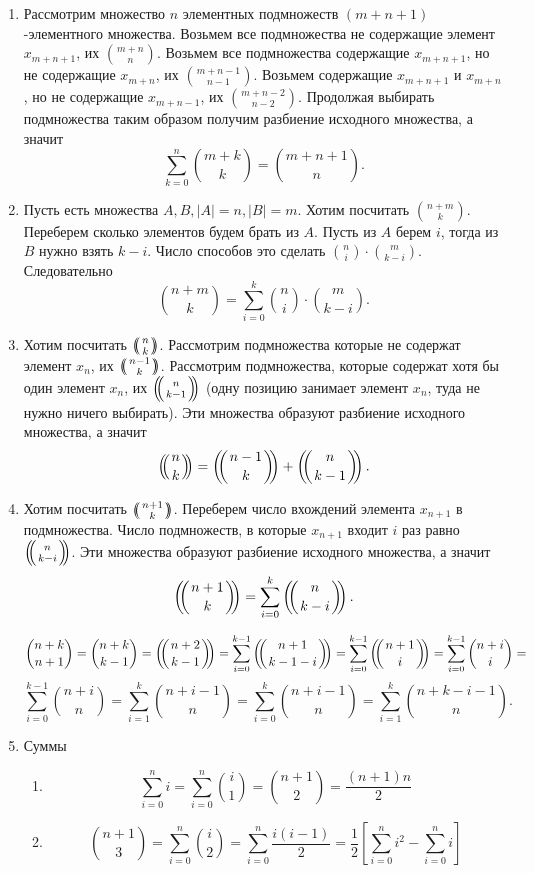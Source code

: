 \documentclass[10pt]{article}
\newcommand{\rchoose}[2]{\left(\mkern-6mu \left({#1 \atop #2}\right) \mkern-6mu \right)}
\begin{document}
\begin{enumerate}[label*=2.\arabic*]
	\item Рассмотрим множество $n$ элементных подмножеств $(m+n+1)$-элементного множества. Возьмем все подмножества не содержащие элемент $x_{m+n+1}$, их ${m+n \choose n}$. Возьмем все подмножества содержащие $x_{m+n+1}$, но не содержащие $x_{m+n}$, их ${m+n-1 \choose n-1}$. Возьмем содержащие $x_{m+n+1}$ и $x_{m+n}$, но не содержащие $x_{m+n-1}$, их ${m+n-2 \choose n-2}$. Продолжая выбирать подмножества таким образом получим разбиение исходного множества, а значит $$\sum_{k=0}^n {m+k \choose k} = {m+n+1 \choose n}.$$
	
	\item Пусть есть множества $A, B, |A|=n, |B|=m$. Хотим посчитать ${n+m \choose k}$. Переберем сколько элементов будем брать из $A$. Пусть из $A$ берем $i$, тогда из $B$ нужно взять $k-i$. Число способов это сделать ${n \choose i} \cdot {m \choose k-i}$. Следовательно $${n+m \choose k} = \sum_{i=0}^k {n \choose i} \cdot {m \choose k-i}.$$
	
	\item Хотим посчитать $\rchoose{n}{k}$. Рассмотрим подмножества которые не содержат элемент $x_n$, их $\rchoose{n-1}{k}$. Рассмотрим подмножества, которые содержат хотя бы один элемент $x_n$, их $\rchoose{n}{k-1}$ (одну позицию занимает элемент $x_n$, туда не нужно ничего выбирать). Эти множества образуют разбиение исходного множества, а значит $$\rchoose{n}{k} = \rchoose{n-1}{k} + \rchoose{n}{k-1}.$$
	
	\item Хотим посчитать $\rchoose{n+1}{k}$. Переберем число вхождений элемента $x_{n+1}$ в подмножества. Число подмножеств, в которые $x_{n+1}$ входит $i$ раз равно $\rchoose{n}{k-i}$. Эти множества образуют разбиение исходного множества, а значит $$\rchoose{n+1}{k} = \sum_{i=0}^k \rchoose{n}{k-i}.$$
	
	$${n+k \choose n+1} = {n+k \choose k-1} = \rchoose{n+2}{k-1} = \sum_{i=0}^{k-1} \rchoose{n+1}{k-1-i} = \sum_{i=0}^{k-1} \rchoose{n+1}{i} = \sum_{i=0}^{k-1} \binom{n+i}{i} =$$  $$\sum_{i=0}^{k-1} \binom{n+i}{n} = \sum_{i=1}^{k} \binom{n+i-1}{n} = \sum_{i=0}^{k} \binom{n+i-1}{n} = \sum_{i=1}^{k} \binom{n+k - i-1}{n}.$$
	
	\item Суммы
	\begin{enumerate}
	\item $$ \sum_{i=0}^n i = \sum_{i=0}^n \binom{i}{1} = \binom{n+1}{2} = \frac{(n+1)n}{2}$$
	\item $$\binom{n+1}{3} = \sum_{i=0}^n \binom{i}{2} = \sum_{i=0}^n \frac{i(i-1)}{2} = \frac{1}{2} \left[ \sum_{i=0}^n {i^2} - \sum_{i=0}^n {i} \right] $$
	

\end{enumerate}
\end{enumerate}
\end{document}
